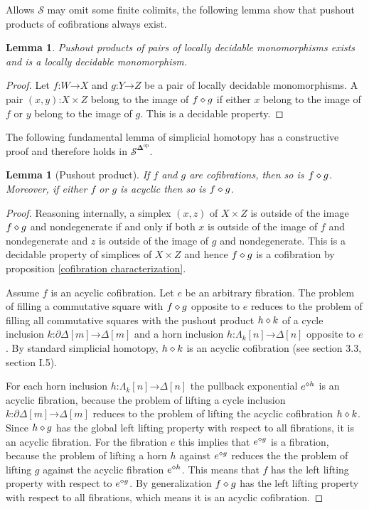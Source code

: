 \documentclass{amsart}
\theoremstyle{plain}
\newtheorem{lemma}[theorem]{Lemma}
\theoremstyle{definition}
\newcommand\cat\mathcal
\newcommand\dual{^{\mathrm{op}}}
\newcommand\simCat{\mathbf\Delta}
\newcommand\s{^{\simCat\dual}}
\newcommand\of{\mathord:}
\renewcommand\to{\mathord\rightarrow}
\newcommand\simplex\Delta
\newcommand\cycle{\partial\Delta}
\newcommand\horn\Lambda
\begin{document}
Allows $\cat S$ may omit some finite colimits, the following lemma show that pushout products of cofibrations always exist.

\begin{lemma} Pushout products of pairs of locally decidable monomorphisms exists and is a locally decidable monomorphism. \end{lemma}

\begin{proof} Let $f\of W\to X$ and $g\of Y\to Z$ be a pair of locally decidable monomorphisms. A pair $(x,y)\of X\times Z$ belong to the image of $f\mathbin\diamond g$ if either $x$ belong to the image of $f$ or $y$ belong to the image of $g$. This is a decidable property.
\end{proof}

The following fundamental lemma of simplicial homotopy has a constructive proof and therefore holds in $\cat S\s$.

\begin{lemma}[Pushout product] If $f$ and $g$ are cofibrations, then so is $f\mathbin\diamond g$. Moreover, if either $f$ or $g$ is acyclic then so is $f\mathbin\diamond g$. \label{pushout product} \end{lemma}

\begin{proof} Reasoning internally, a simplex $(x,z)$ of $X\times Z$ is outside of the image $f\mathbin\diamond g$ and nondegenerate if and only if both $x$ is outside of the image of $f$ and nondegenerate and $z$ is outside of the image of $g$ and nondegenerate. This is a decidable property of simplices of $X\times Z$ and hence $f\mathbin\diamond g$ is a cofibration by proposition \ref{cofibration characterization}. 

Assume $f$ is an acyclic cofibration. Let $e$ be an arbitrary fibration. The problem of filling a commutative square with $f\mathbin\diamond g$ opposite to $e$ reduces to the problem of filling all commutative squares with the pushout product $h\mathbin\diamond k$ of a cycle inclusion $k\of \cycle[m]\to \simplex[m]$ and a horn inclusion $h\of \horn_k[n]\to\simplex[n]$ opposite to $e$. By standard simplicial homotopy, $h\mathbin\diamond k$ is an acyclic cofibration (see \cite{Hovey99} section 3.3, \cite{GJSHT} section I.5).

For each horn inclusion $h\of \horn_k[n]\to \simplex[n]$ the pullback exponential $e^{\diamond h}$ is an acyclic fibration, because the problem of lifting a cycle inclusion $k\of \cycle[m]\to \simplex[m]$ reduces to the problem of lifting the acyclic cofibration $h\mathbin\diamond k$. Since $h\mathbin\diamond g$ has the global left lifting property with respect to all fibrations, it is an acyclic fibration. For the fibration $e$ this implies that $e^{\diamond g}$ is a fibration, because the problem of lifting a horn $h$ against $e^{\diamond g}$ reduces the the problem of lifting $g$ against the acyclic fibration $e^{\diamond h}$. This means that $f$ has the left lifting property with respect to $e^{\diamond g}$. By generalization $f\mathbin\diamond g$ has the left lifting property with respect to all fibrations, which means it is an acyclic cofibration.
\end{proof}
\end{document}
